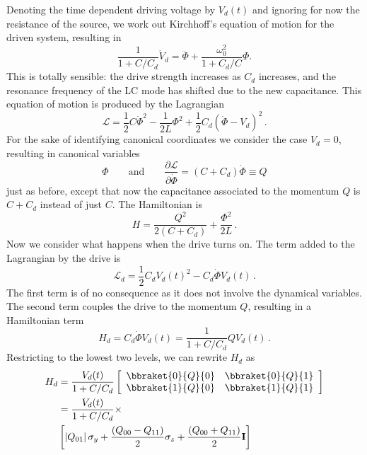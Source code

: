Denoting the time dependent driving voltage by $V_d(t)$ and ignoring for now the resistance of the source, we work out Kirchhoff's equation of motion for the driven system, resulting in
\begin{equation}
\frac{1}{1+C/C_d} \dot{V}_d = \ddot{\Phi} + \frac{\omega_0^2}{1 + C_d/C} \Phi. \end{equation}
This is totally sensible: the drive strength increases as $C_d$ increases, and the resonance frequency of the LC mode has shifted due to the new capacitance.
This equation of motion is produced by the Lagrangian
\begin{equation}
\mathcal{L} = \frac{1}{2}C \dot{\Phi}^2 - \frac{1}{2L}\Phi^2 + \frac{1}{2} C_d \left( \dot{\Phi} - V_d \right)^2 \, .
\end{equation}
For the sake of identifying canonical coordinates we consider the case $V_d=0$, resulting in canonical variables
\begin{equation*}
  \Phi
  \qquad \textrm{and} \qquad
  \frac{\partial \mathcal{L}}{\partial \dot{\Phi}} = \left( C + C_d \right) \dot{\Phi} \equiv Q
\end{equation*}
just as before, except that now the capacitance associated to the momentum $Q$ is $C+C_d$ instead of just $C$.
The Hamiltonian is
\begin{equation}
H = \frac{Q^2}{2 (C + C_d)} + \frac{\Phi^2}{2L} \, .
\end{equation}
Now we consider what happens when the drive turns on.
The term added to the Lagrangian by the drive is
\begin{equation}
  \mathcal{L}_d = \frac{1}{2}C_d V_d(t)^2 - C_d \dot{\Phi} V_d(t) \, .
\end{equation}
The first term is of no consequence as it does not involve the dynamical variables.
The second term couples the drive to the momentum $Q$, resulting in a Hamiltonian term
\begin{equation*}
H_d
  = C_d \dot{\Phi}V_d(t)
  = \frac{1}{1+C/C_d} Q V_d(t) \, . \label{eq:sec:driving:H_dVsCircuitParams}
\end{equation*}
Restricting to the lowest two levels, we can rewrite $H_d$ as
\begin{align}
  H_d
  &= \frac{V_d(t)}{1 + C/C_d}
  \left[ \begin{array}{cc}
    \bbraket{0}{Q}{0} & \bbraket{0}{Q}{1} \\
    \bbraket{1}{Q}{0} & \bbraket{1}{Q}{1}
  \end{array} \right] \\
  &= \frac{V_d(t)}{1 + C/C_d} \times \nonumber \\
  &\left[
    \left| Q_{01} \right| \sigma_y
    + \frac{\left( Q_{00} - Q_{11} \right)}{2} \sigma_z
    + \frac{\left( Q_{00} + Q_{11} \right)}{2} \mathbf{I}
  \right]
\end{align}
